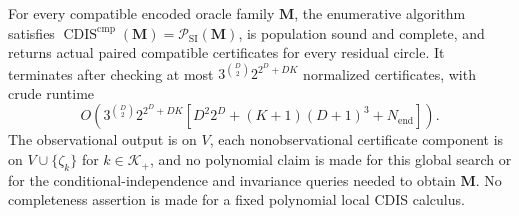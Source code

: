 For every compatible encoded oracle family \(\mathbf M\), the enumerative algorithm satisfies \(\operatorname{CDIS}^{\mathrm{cmp}}(\mathbf M)=\mathcal P_{\mathrm{SI}}(\mathbf M)\), is population sound and complete, and returns actual paired compatible certificates for every residual circle.  It terminates after checking at most \(3^{\binom D2}2^{2^D+DK}\) normalized certificates, with crude runtime
\[
O\!\left(3^{\binom D2}2^{2^D+DK}
\left[D^2 2^D+(K+1)(D+1)^3+N_{\mathrm{end}}\right]\right).
\]
The observational output is on \(V\), each nonobservational certificate component is on \(V\cup\{\zeta_k\}\) for \(k\in\mathcal K_+\), and no polynomial claim is made for this global search or for the conditional-independence and invariance queries needed to obtain \(\mathbf M\).  No completeness assertion is made for a fixed polynomial local CDIS calculus.